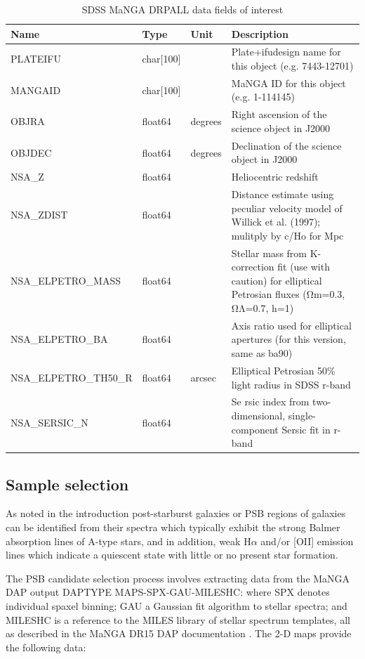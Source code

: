 \begin{table}
\caption[MaNGA DRPALL fields]{SDSS MaNGA DRPALL data fields of interest}
\label{tab:DRPall-table}
\begin{tabular}{|p{3.2cm}|p{1.2cm}||p{1cm}|p{10cm}|}
\hline
Name & Type & Unit & Description \\
\hline
PLATEIFU & char{[}100{]} &  & Plate+ifudesign name for this object (e.g. 7443-12701)\\
MANGAID & char{[}100{]} & & MaNGA ID for this object (e.g. 1-114145)\\
OBJRA & float64 & degrees & Right ascension of the science object in J2000\\
OBJDEC & float64 & degrees & Declination of the science object in J2000\\
NSA\_Z & float64 &  & Heliocentric redshift\\
NSA\_ZDIST & float64 &  & Distance estimate using peculiar velocity model of Willick et al. (1997); mulitply by c/Ho for Mpc\\
NSA\_ELPETRO\_MASS & float64 &  & Stellar mass from K-correction fit (use with caution) for elliptical Petrosian fluxes (Ωm=0.3, ΩΛ=0.7, h=1)\\
NSA\_ELPETRO\_BA & float64 &  & Axis ratio used for elliptical apertures (for this version, same as ba90)\\
NSA\_ELPETRO\_TH50\_R & float64 & arcsec & Elliptical Petrosian 50\% light radius in SDSS r-band\\
NSA\_SERSIC\_N & float64 &  & Se
rsic index from two-dimensional, single-component Sersic fit in r-band\\
\hline
\end{tabular}
\end{table}

\subsection{Sample selection}
As noted in the introduction post-starburst galaxies or PSB regions of galaxies can be identified from their spectra which typically exhibit the strong Balmer absorption lines of A-type stars, and in addition, weak H$\alpha$ and/or [OII] emission lines which indicate a quiescent state with little or no present star formation. 

The PSB candidate selection process involves extracting data from the MaNGA DAP output DAPTYPE MAPS-SPX-GAU-MILESHC: where SPX denotes individual spaxel binning; GAU a Gaussian fit algorithm to stellar spectra; and MILESHC is a reference to the MILES library \citep{2011A&A...532A..95F} of stellar spectrum templates, all as described in the MaNGA DR15 DAP documentation \citet{2019arXiv190100856W}. 
The 2-D maps provide the following data: 


